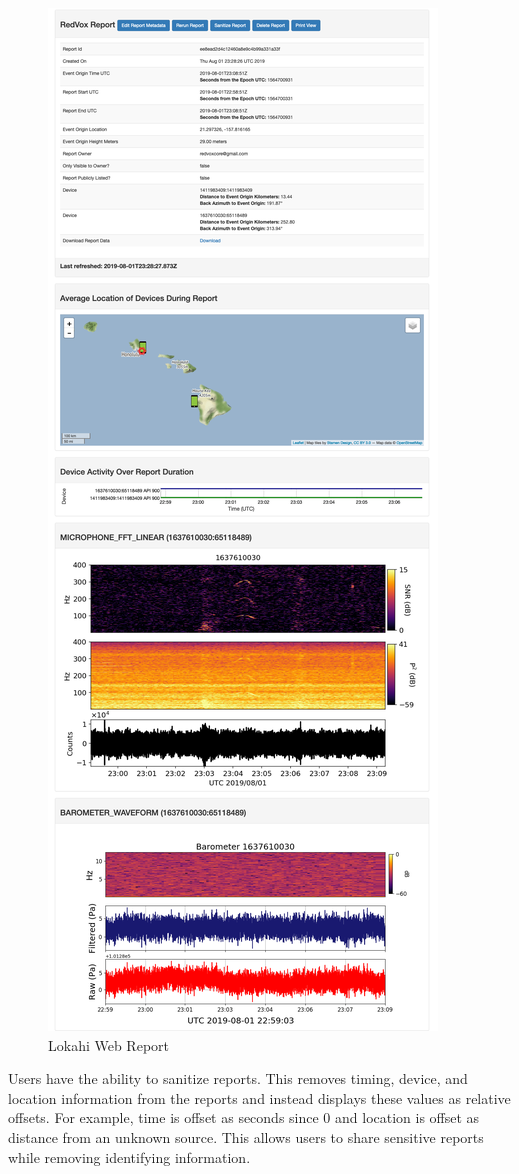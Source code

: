 \begin{figure}
	\centering
	\includegraphics[width=0.7\linewidth]{figures/lweb_report.png}
	\caption{Lokahi Web Report}
	\label{fig:lweb_report}
\end{figure}

Users have the ability to sanitize reports. This removes timing, device, and location information from the reports and instead displays these values as relative offsets. For example, time is offset as seconds since 0 and location is offset as distance from an unknown source. This allows users to share sensitive reports while removing identifying information.

